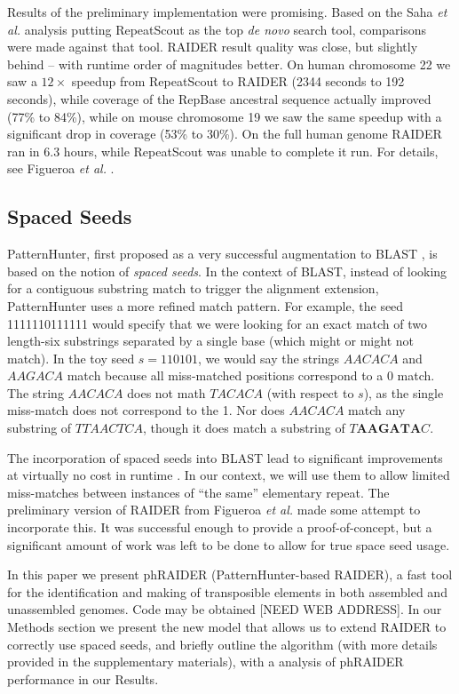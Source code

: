 \documentclass{bmcart}
\begin{document}
Results of the preliminary implementation were promising.  Based on
the Saha {\it et al.} analysis putting RepeatScout as the top {\it de
  novo} search tool, comparisons were made against that tool.  RAIDER result
quality was close, but slightly behind -- with runtime
order of magnitudes better.  On human chromosome 22 we saw a
$12\times$ speedup from RepeatScout to RAIDER (2344 seconds to 192 seconds), while coverage
of the RepBase  \cite{Jurka:2005bl} ancestral sequence actually improved (77\% to 84\%), while on mouse chromosome 19 we saw 
the same speedup with a significant drop in coverage (53\% to 30\%).  On
the full human genome RAIDER ran in $6.3$ hours, while RepeatScout was
unable to complete it run.  For details, see Figueroa {\it et al.} \cite{Figueroa:2014uk}.

\subsection*{Spaced Seeds}
 
PatternHunter, first proposed as a very successful augmentation to
BLAST \cite{Li:2004wl,Altschul:1997p843}, is based on the notion of {\it
  spaced seeds}.  In the context of BLAST, instead of looking for a
contiguous substring match to trigger the alignment extension,
PatternHunter uses a more refined match pattern.  For example, the
seed 1111110111111 would specify that we were looking for an exact
match of two length-six substrings separated by a single base (which
might or might not match).  In the toy seed $s=110101$, we would say the
strings $AACACA$ and $AAGACA$ match because all miss-matched positions correspond to a 
0 match.  The string $AACACA$ does not math $TACACA$ (with respect to
$s$), as the single miss-match does not correspond to the 1.  Nor does
$AACACA$ match any substring of $TTAACTCA$, though it does match a
substring of $T\mathbf{AAGATA}C$.

The incorporation of spaced seeds into BLAST lead to significant
improvements at virtually no cost in runtime \cite{Li:2004wl}.
In our context, we will use them to allow limited
miss-matches between instances of ``the same'' elementary repeat.  The
preliminary version of RAIDER from Figueroa {\it et al.} made some
attempt to incorporate this.  It was successful enough to provide a
proof-of-concept, but a significant amount of work was left to be
done to allow for true space seed usage.

In this paper we present phRAIDER (PatternHunter-based RAIDER), a fast
tool for the identification and making of transposible elements in
both assembled and unassembled genomes. Code  may be obtained [NEED WEB ADDRESS].  In our Methods section
we present the new model that allows us to extend RAIDER to correctly
use spaced seeds, and briefly outline the algorithm (with more details
provided in the supplementary materials), with a analysis of phRAIDER
performance in our Results.
\end{document}
